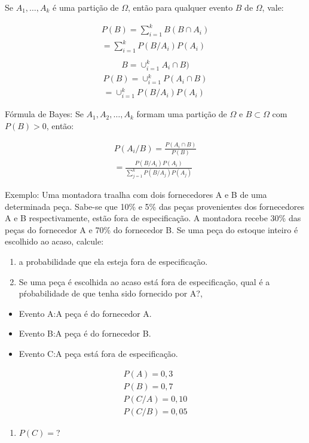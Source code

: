 \documentclass[11pt,a4paper]{book}
\begin{document}
\begin{enumerate}[label=(\alph*)]
\begin{enumerate}
\begin{enumerate}[label=(\alph*)]
    Se $A_1,\ldots, A_k$ é uma partição de $\Omega$, então para qualquer evento 
    $B$ de $\Omega$, vale:

    \begin{align}
      P(B)= \sum^k_{i=1} B(B \cap A_i)\\
      = \sum^k_{i=1} P(B/A_i)P(A_i)\\
    \end{align}
    \begin{align}
      B= \cup_{i=1}^k A_i \cap B)
    \end{align}
    \begin{align}
      P(B)= \cup_{i=1}^k P(A_i \cap B)\\
      = \cup_{i=1}^k P(B/A_i)P(A_i)
    \end{align}
\end{enumerate}

Fórmula de Bayes: Se $A_1,A_2,\ldots, A_k$ formam uma partição de $\Omega$ e 
$B \subset \Omega$ com $P(B)>0$, então:

\begin{align}
  P(A_i/ B)= \frac{P(A_i \cap B)}{P(B)}\\
  =\frac{P(B/A_i)P(A_i)}{\sum_{j=1}^k P(B/A_j)P(A_j)}
\end{align}

Exemplo: Uma montadora traalha com dois fornecedores A e B de uma determinada peça.
Sabe-se que 10\% e 5\% das peças provenientes dos fornecedores A e B respectivamente,
estão fora de especificação. A montadora recebe 30\% das peças do fornecedor A e 70\%
do fornecedor B. Se uma peça do estoque inteiro é escolhido ao acaso, calcule:

\begin{enumerate}[label=(\alph*)]
  \item a probabilidade que ela esteja fora de especificação.
  \item Se uma peça é escolhida ao acaso está fora de especificação, qual é a 
    pŕobabilidade de que tenha sido fornecido por A?\@,
\end{enumerate}
\begin{itemize}
  \item Evento A:\@ A peça é do fornecedor A.
  \item Evento B:\@ A peça é do fornecedor B.
  \item Evento C:\@ A peça está fora de especificação.
\end{itemize}
\begin{align*}
  P(A)= 0,3\\
  P(B)=0,7\\
  P(C/A)= 0,10\\
  P(C/B)= 0,05
\end{align*}
\begin{figure}
  \label{fig:5}
\end{figure}
\begin{enumerate}[label=(\alph*)]
  \item $P(C)=$?


\end{enumerate}
\end{enumerate}
\end{enumerate}
\end{document}

